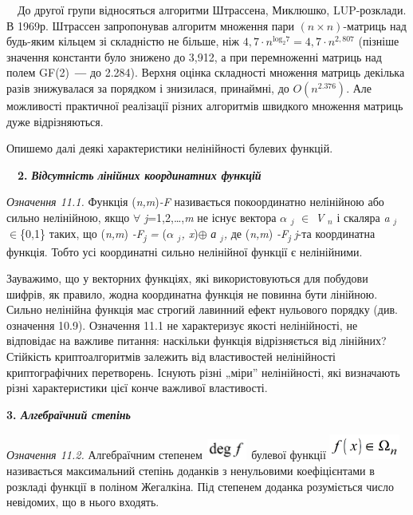 \ \ До другої групи відносяться алгоритми Штрассена, Миклюшко, LUP-розклади. В
1969р. Штрассен запропонував алгоритм множення пари  ${(n\times n)}${}-матриць
над будь-яким кільцем зі складністю не більше, ніж  ${4,7\cdot
n^{{\text{log}_{{2}}7}}=4,7\cdot n^{2,\text{807}}}$ (пізніше значення константи
було знижено до 3,912, а при перемноженні матриць над полем
GF(2)\textbf{\textit{ --- }}до  2.284). Верхня оцінка складності множення матриць
декілька разів знижувалася за порядком і  знизилася, принаймні, до 
${O(n^{{2\text{.}\text{376}}})}$. Але можливості практичної реалізації  різних
алгоритмів швидкого множення матриць дуже відрізняються. 

Опишемо далі деякі характеристики нелінійності булевих функцій.


\bigskip

\ \ \textbf{2. }\textbf{\textit{Відсутність}}\textbf{  }\textbf{\textit{лінійних
координатних функцій}}

 \textit{Означення 11.1.}\textit{ } Функція (\textit{n,m})\textit{{}-}\textit{F}
 називається покоординатно нелінійною або сильно нелінійною, якщо ${\forall}$
\textit{j}=1,2,…,\textit{m }не існує вектора ${\alpha}$ ${{}_{{j}}}$ ${\in}$
\textit{V} ${{}_{{n}}}$ і скаляра \textit{a} ${{}_{{j}}}$${\in}$\{0,1\} таких,
що (\textit{n,m})\textit{ -F{\textbar}}\textit{\textsubscript{j}}\textit{ =}
(\textit{${\alpha}$} ${{}_{{j}}}$\textit{, x})${\oplus}$\textit{ }\textit{а}
${{}_{{j}}}$\textit{, }де (\textit{n,m})\textit{
-F{\textbar}}\textit{\textsubscript{j}} \textit{ }\textit{j}{}-та координатна
функція. Тобто усі координатні сильно нелінійної функції є нелінійними.

Зауважимо, що у векторних функціях, які використовуються для побудови шифрів, як
правило, жодна координатна функція не повинна бути лінійною. Сильно нелінійна
функція має строгий лавинний ефект нульового порядку (див. означення 10.9).
Означення 11.1 не характеризує якості нелінійності, не відповідає на важливе
питання:  наскільки функція відрізняється від лінійних? Стійкість
криптоалгоритмів залежить від властивостей нелінійності  криптографічних
перетворень.  Існують різні „міри” нелінійності, які визначають різні
характеристики цієї конче важливої властивості. 


\bigskip


\bigskip

{\bfseries
3.\textit{ Алгебраїчний степінь}}

 \textit{Означення 11.2.}\textit{ }Алгебраїчним степенем 
\includegraphics[width=0.5425in,height=0.2665in]{crypt-img/crypt-img256.png} 
булевої функції 
\includegraphics[width=0.9098in,height=0.3354in]{crypt-img/crypt-img257.png} 
називається максимальний степінь доданків з ненульовими коефіцієнтами в
розкладі функції в поліном Жегалкіна. Під степенем доданка розуміється число
невідомих, що в нього входять. 

